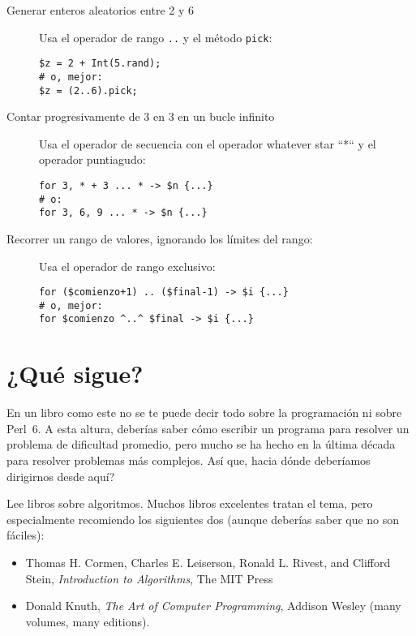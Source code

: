 \begin{description}
\item[Generar enteros aleatorios entre 2 y 6] Usa el operador
de rango \verb|..| y el método {\tt pick}:
\begin{verbatim}
$z = 2 + Int(5.rand);
# o, mejor:
$z = (2..6).pick;
\end{verbatim}

\item[Contar progresivamente de 3 en 3 en un bucle infinito] Usa 
el operador de secuencia con el operador whatever star ``*``
y el operador puntiagudo:

\begin{verbatim}
for 3, * + 3 ... * -> $n {...}
# o:
for 3, 6, 9 ... * -> $n {...}    
\end{verbatim}

\item[Recorrer un rango de valores, ignorando los límites del rango:] Usa
el operador de rango exclusivo:

\begin{verbatim}
for ($comienzo+1) .. ($final-1) -> $i {...}
# o, mejor:
for $comienzo ^..^ $final -> $i {...}
\end{verbatim}
\end{description}

\section{¿Qué sigue?}

En un libro como este no se te puede decir todo sobre la
programación ni sobre Perl~6. A esta altura, deberías saber cómo
escribir un programa para resolver un problema de dificultad promedio,
pero mucho se ha hecho en la última década para resolver problemas
más complejos. Así que, hacia dónde deberíamos dirigirnos desde aquí?

Lee libros sobre algoritmos. Muchos libros excelentes tratan el tema,
pero especialmente recomiendo los siguientes dos (aunque deberías saber que no
son fáciles):
\begin{itemize}
\item Thomas H. Cormen, Charles E. Leiserson, Ronald L. Rivest, 
and Clifford Stein, \emph{Introduction to 
Algorithms}, The MIT Press
\item Donald Knuth, \emph{The Art of Computer Programming}, Addison Wesley 
(many volumes, many editions).
\end{itemize}

